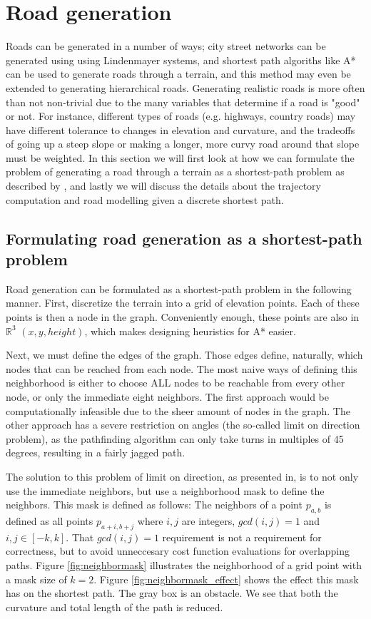 \section{Road generation}
Roads can be generated in a number of ways; city street networks can be generated using using Lindenmayer systems\cite{citymodelling}, and shortest path algoriths like A* can be used to generate roads through a terrain, and this method may even be extended to generating hierarchical roads.\cite{roadgen}\cite{roadgen2}
Generating realistic roads is more often than not non-trivial due to the many variables that determine if a road is "good" or not. For instance, different types of roads (e.g. highways, country roads) may have different tolerance to changes in elevation and curvature, and the tradeoffs of going up a steep slope or making a longer, more curvy road around that slope must be weighted. In this section we will first look at how we can formulate the problem of generating a road through a terrain as a shortest-path problem as described by \cite{roadgen}, and lastly we will discuss the details about the trajectory computation and road modelling given a discrete shortest path.

\subsection{Formulating road generation as a shortest-path problem}
\label{sec:roadgen_shortestpath}
Road generation can be formulated as a shortest-path problem in the following manner. First, discretize the terrain into a grid of elevation points. Each of these points is then a node in the graph. Conveniently enough, these points are also in $\mathbb{R}^3$ $(x,y,height)$, which makes designing heuristics for A* easier.

Next, we must define the edges of the graph. Those edges define, naturally, which nodes that can be reached from each node. The most naive ways of defining this neighborhood is either to choose ALL nodes to be reachable from every other node, or only the immediate eight neighbors. The first approach would be computationally infeasible due to the sheer amount of nodes in the graph. The other approach has a severe restriction on angles (the so-called limit on direction problem\cite{roadgen}), as the pathfinding algorithm can only take turns in multiples of 45 degrees, resulting in a fairly jagged path. 

The solution to this problem of limit on direction, as presented in\cite{roadgen}, is to not only use the immediate neighbors, but use a neighborhood mask to define the neighbors. This mask is defined as follows: The neighbors of a point $p_{a,b}$ is defined as all points $p_{a+i,b+j}$ where $i,j$ are integers, $gcd(i,j) = 1$ and $i,j \in [-k,k]$. That $gcd(i,j)=1$ requirement is not a requirement for correctness, but to avoid unneccesary cost function evaluations for overlapping paths. Figure \ref{fig:neighbormask} illustrates the neighborhood of a grid point with a mask size of $k=2$. Figure \ref{fig:neighbormask_effect} shows the effect this mask has on the shortest path. The gray box is an obstacle. We see that both the curvature and total length of the path is reduced.


